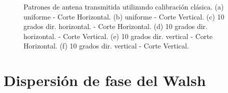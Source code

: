 \begin{figure}[H]
		\caption{Patrones de antena transmitida utilizando calibración clásica. (a) uniforme - Corte Horizontal. (b) uniforme - 
			Corte Vertical. (c) 10 grados dir. horizontal. - Corte Horizontal. (d) 10 grados dir. horizontal. - Corte Vertical. (e) 10 
			grados dir. vertical - Corte Horizontal. (f) 10 grados dir. vertical - Corte Vertical.}
	\label{fig:chirpRepErrorClassicalPat}
\end{figure}


\section{Dispersión de fase del Walsh}

